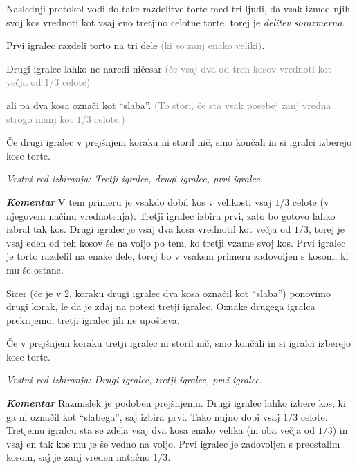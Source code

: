\documentclass[a4paper,12pt]{article}
\begin{document}
Naslednji protokol vodi do take razdelitve torte med tri ljudi, da vsak izmed njih svoj kos vrednoti kot vsaj eno tretjino celotne torte, torej je  {\em delitev sorazmerna}.


\begin{protokol}

\item Prvi igralec razdeli torto na tri dele \textcolor{gray}{(ki so zanj enako veliki)}.

\item Drugi igralec lahko ne naredi ničesar \textcolor{gray}{(če vsaj dva od treh kosov vrednoti kot večja od $1/3$ celote)}

ali pa dva kosa označi kot ``slaba''. \textcolor{gray}{(To stori, če sta vsak posebej zanj vredna strogo manj kot $1/3$ celote.)}

\item Če drugi igralec v prejšnjem koraku ni storil nič, smo končali in si igralci izberejo kose torte.

\textsl{Vrstni red izbiranja: Tretji igralec, drugi igralec, prvi igralec.}

\item [\textbf { \em Komentar}] V tem primeru je vsakdo dobil kos v velikosti vsaj  $1/3$ celote (v njegovem načinu vrednotenja). Tretji igralec izbira prvi, zato bo gotovo lahko izbral tak kos. Drugi igralec je vsaj dva kosa vrednotil kot večja od  $1/3$, torej je vsaj eden od teh kosov še na voljo po tem, ko tretji vzame svoj kos. Prvi igralec je torto razdelil na enake dele, torej bo v vsakem primeru zadovoljen s kosom, ki mu še ostane.

\item Sicer (če je v 2. koraku drugi igralec dva kosa označil kot ``slaba'') ponovimo drugi korak, le da je zdaj na potezi tretji igralec. Oznake drugega igralca prekrijemo, tretji igralec jih ne upošteva.

\item Če v prejšnjem koraku tretji igralec ni storil nič, smo končali in si igralci izberejo kose torte.

\textsl{Vrstni red izbiranja: Drugi igralec, tretji igralec, prvi igralec.}

\item [\textbf{\em Komentar}] Razmislek je podoben prejšnjemu. Drugi igralec lahko izbere kos, ki ga ni označil kot ``slabega'', saj izbira prvi. Tako nujno dobi vsaj $1/3$ celote. Tretjemu igralcu sta se zdela vsaj dva kosa enako velika (in oba večja od $1/3$) in vsaj en tak kos mu je še vedno na voljo. Prvi igralec je zadovoljen s preostalim kosom, saj je zanj vreden natačno $1/3$.


\end{protokol}
\end{document}
